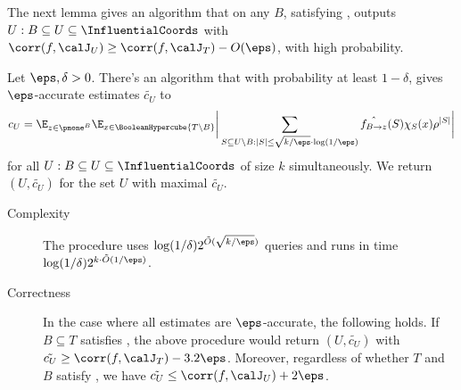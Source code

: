 The next lemma gives an algorithm that on any $B$,  satisfying ,  outputs $U: B \subseteq U \subseteq \InfluentialCoords$
with $\corr(f, \calJ_U) \ge \corr(f, \calJ_T)-O(\eps)$, with high probability. 
%
\begin{lemma}\label{lemma:phase-two-correctness}
Let $\eps,\delta>0$. There's an algorithm that with probability at least $1-\delta$, gives $\eps$-accurate estimates $\tilde{c_U}$ to 
$$
{c_U} =  \E_{z\in \pmone^B}\E_{x \in \BooleanHypercube{T\setminus B}}\bigg | \sum_{S\subseteq U\setminus B:|S|\le \sqrt{k/\eps} \cdot \log(1/\eps)}\hat{f_{B\to z}}(S) \chi_S(x)\rho^{|S|}\bigg |
$$
for all $U: B \subseteq U \subseteq \InfluentialCoords$ of size $k$ simultaneously.
We  return  $(U,\tilde{c_U})$ for the set $U$ with maximal $\tilde{c_U}$.

\begin{description}
\item[Complexity] The procedure uses $\log(1/\delta)2^{\tilde{O}(\sqrt{k/\eps})}$ queries and runs in time $\log(1/\delta)2^{k\cdot \tilde{O}(1/\eps)}$.
\item[Correctness]
In the case where all estimates are $\eps$-accurate, the following holds.
If $B\subseteq T$  satisfies , the above procedure would return $(U, \tilde{c_U})$ with $\tilde{c_U} \ge \corr(f, \calJ_T) - 3.2\eps$.
Moreover, regardless of whether $T$ and $B$ satisfy , we have $\tilde{c_U} \le \corr(f, \calJ_U) + 2\eps$.
\end{description}


\end{lemma}
